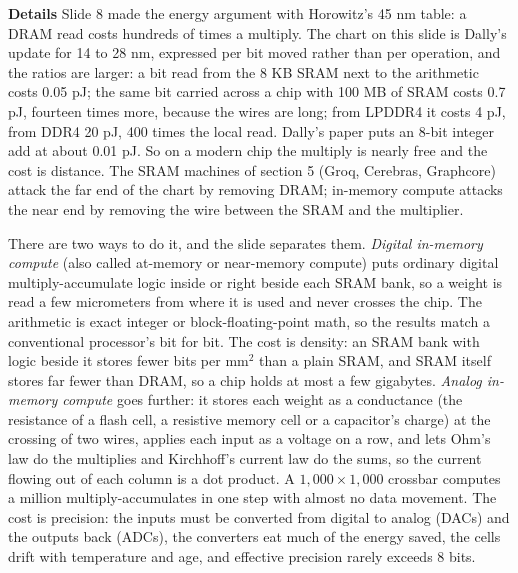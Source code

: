 \documentclass[11pt,letterpaper]{article}
\newcommand{\para}[1]{\medskip\noindent\textbf{#1}\quad}
\begin{document}
\para{Details} Slide 8 made the energy argument with Horowitz's 45 nm table: a DRAM read costs hundreds of times a multiply. The chart on this slide is Dally's update for 14 to 28 nm, expressed per bit moved rather than per operation, and the ratios are larger: a bit read from the 8 KB SRAM next to the arithmetic costs 0.05 pJ; the same bit carried across a chip with 100 MB of SRAM costs 0.7 pJ, fourteen times more, because the wires are long; from LPDDR4 it costs 4 pJ, from DDR4 20 pJ, 400 times the local read. Dally's paper puts an 8-bit integer add at about 0.01 pJ. So on a modern chip the multiply is nearly free and the cost is distance. The SRAM machines of section 5 (Groq, Cerebras, Graphcore) attack the far end of the chart by removing DRAM; in-memory compute attacks the near end by removing the wire between the SRAM and the multiplier.

There are two ways to do it, and the slide separates them. \emph{Digital in-memory compute} (also called at-memory or near-memory compute) puts ordinary digital multiply-accumulate logic inside or right beside each SRAM bank, so a weight is read a few micrometers from where it is used and never crosses the chip. The arithmetic is exact integer or block-floating-point math, so the results match a conventional processor's bit for bit. The cost is density: an SRAM bank with logic beside it stores fewer bits per mm$^2$ than a plain SRAM, and SRAM itself stores far fewer than DRAM, so a chip holds at most a few gigabytes. \emph{Analog in-memory compute} goes further: it stores each weight as a conductance (the resistance of a flash cell, a resistive memory cell or a capacitor's charge) at the crossing of two wires, applies each input as a voltage on a row, and lets Ohm's law do the multiplies and Kirchhoff's current law do the sums, so the current flowing out of each column is a dot product. A $1{,}000\times1{,}000$ crossbar computes a million multiply-accumulates in one step with almost no data movement. The cost is precision: the inputs must be converted from digital to analog (DACs) and the outputs back (ADCs), the converters eat much of the energy saved, the cells drift with temperature and age, and effective precision rarely exceeds 8 bits.
\end{document}
